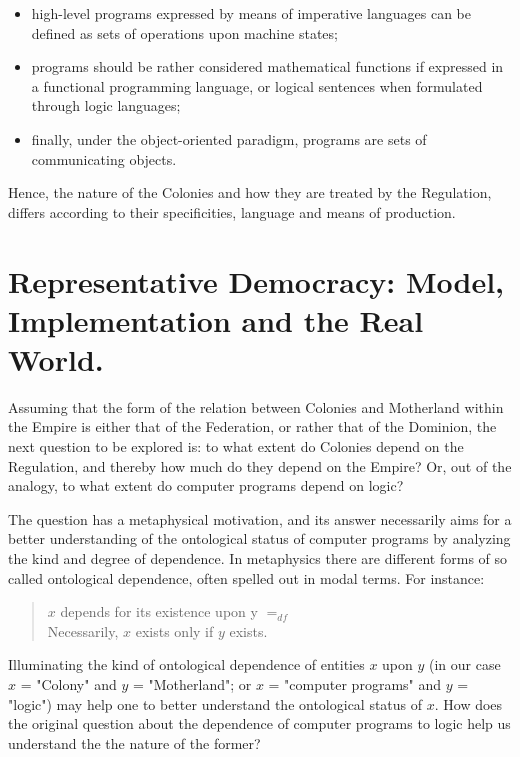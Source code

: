 \documentclass[]{article}
\begin{document}
\begin{itemize}
	\item  high-level programs expressed by means of imperative languages can be defined as sets of operations upon machine states;
	\item  programs should be rather considered mathematical functions if expressed in a functional programming language, or logical sentences when formulated
	through logic languages;
	\item finally, under the object-oriented paradigm, programs are sets of
	communicating objects.
\end{itemize}
%
Hence, the nature of the Colonies and how they are treated by the Regulation, differs according to their specificities, language and means of production.





\section{Representative Democracy: Model, Implementation and the Real World.}



{\color{red}{this passage is inspired by Nick's note}}

Assuming that the form of the relation between Colonies and Motherland within the Empire is either that of the Federation, or rather that of the Dominion, the next question to be explored is: to what extent do Colonies depend on the Regulation, and thereby how much do they depend on the Empire? Or, out of the analogy, to what extent do computer programs depend on logic?

The question has a metaphysical motivation, and its answer necessarily aims for a better understanding of the ontological status of computer programs by analyzing the kind and degree of dependence. In metaphysics there are different forms of so called ontological dependence, often spelled out in modal terms. For instance:

\begin{quote}
$x$ depends for its existence upon y $=_{df}$\\
Necessarily, $x$ exists only if $y$ exists.
\end{quote}
%
Illuminating the kind of ontological dependence of entities $x$ upon $y$ (in
our case $x$ = "Colony" and $y$ = "Motherland"; or $x$ = "computer programs" and $y$ = "logic") may help one to better understand the ontological status of $x$. How does the original question about the dependence of computer programs to logic help us understand the the nature of the former?
\end{document}
